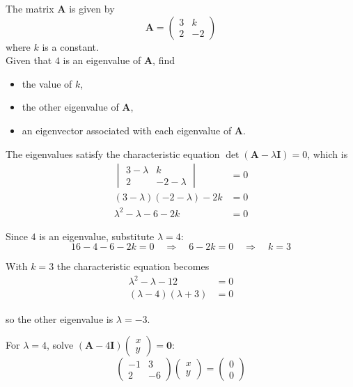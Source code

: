 \documentclass[leqno]{article}
\begin{document}
\djsFrontMatter
\begin{enumerate}[
  label=\textbf{\arabic*.},
  leftmargin=*,
  topsep=0pt,
  partopsep=0pt,
  parsep=0pt
]

\questionitem

The matrix $\mathbf{A}$ is given by
\[\mathbf{A} = \begin{pmatrix} 3 & k \\ 2 & -2 \end{pmatrix}\]
where $k$ is a constant. \\

Given that $4$ is an eigenvalue of $\mathbf{A}$, find
\begin{itemize}
  \item the value of $k$,
  \item the other eigenvalue of $\mathbf{A}$,
  \item an eigenvector associated with each eigenvalue of $\mathbf{A}$.
\end{itemize}

\vspace*{10pt}

\begin{djsSolution}
The eigenvalues satisfy the characteristic equation \(\det(\mathbf{A}-\lambda\mathbf{I})=0\), which is
\begin{align*}
\begin{vmatrix} 3-\lambda & k \\ 2 & -2-\lambda \end{vmatrix} &= 0\\
(3-\lambda)(-2-\lambda)-2k &= 0\\
\lambda^2-\lambda-6-2k &= 0
\end{align*}

Since \(4\) is an eigenvalue, substitute \(\lambda=4\):
\[
16-4-6-2k=0\quad\Longrightarrow\quad 6-2k=0\quad\Longrightarrow\quad k=3
\]

With \(k=3\) the characteristic equation becomes
\begin{align*}
\lambda^2-\lambda-12&=0\\
(\lambda-4)(\lambda+3)&=0
\end{align*}

so the other eigenvalue is \(\lambda=-3\).

For \(\lambda=4\), solve \((\mathbf{A}-4\mathbf{I})\begin{pmatrix}x\\y\end{pmatrix}=\mathbf{0}\):
\[
\begin{pmatrix} -1 & 3 \\ 2 & -6 \end{pmatrix}\begin{pmatrix}x\\y\end{pmatrix}=\begin{pmatrix}0\\0\end{pmatrix}
\]


\end{djsSolution}
\end{enumerate}
\end{document}
